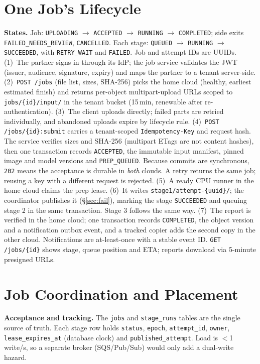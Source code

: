 \documentclass[10pt,a4paper]{article}
\begin{document}
\section{One Job's Lifecycle}
\begin{sloppypar}
\textbf{States.} Job: \texttt{UPLOADING} $\rightarrow$ \texttt{ACCEPTED} $\rightarrow$ \texttt{RUNNING}
$\rightarrow$ \texttt{COMPLETED}; side exits \texttt{FAILED\_NEEDS\_REVIEW}, \texttt{CANCELLED}. Each stage:
\texttt{QUEUED} $\rightarrow$ \texttt{RUNNING} $\rightarrow$ \texttt{SUCCEEDED}, with \texttt{RETRY\_WAIT} and
\texttt{FAILED}. Job and attempt IDs are UUIDs.
(1)~The partner signs in through its IdP; the job service validates the JWT (issuer, audience,
signature, expiry) and maps the partner to a tenant server-side.
(2)~\texttt{POST /jobs} (file list, sizes, SHA-256) picks the home cloud (healthy, earliest estimated
finish) and returns per-object multipart-upload URLs scoped to \texttt{jobs/\{id\}/input/} in the tenant
bucket (15\,min, renewable after re-authentication).
(3)~The client uploads directly; failed parts are retried individually, and abandoned uploads expire by
lifecycle rule.
(4)~\texttt{POST /jobs/\{id\}:submit} carries a tenant-scoped \texttt{Idempotency-Key} and request hash. The
service verifies sizes and SHA-256 (multipart ETags are not content hashes), then one transaction records
\texttt{ACCEPTED}, the immutable input manifest, pinned image and model versions and \texttt{PREP\_QUEUED}.
Because commits are synchronous, \texttt{202} means the acceptance is durable in \emph{both} clouds. A retry
returns the same job; reusing a key with a different request is rejected.
(5)~A ready CPU runner in the home cloud claims the prep lease.
(6)~It writes \texttt{stage1/attempt-\{uuid\}/}; the coordinator publishes it (\S\ref{sec:fail}), marking the
stage \texttt{SUCCEEDED} and queuing stage 2 in the same transaction. Stage 3 follows the same way.
(7)~The report is verified in the home cloud; one transaction records \texttt{COMPLETED}, the object
version and a notification outbox event, and a tracked copier adds the second copy in the other cloud.
Notifications are at-least-once with a stable event ID. \texttt{GET /jobs/\{id\}} shows stage, queue
position and ETA; reports download via 5-minute presigned URLs.
\end{sloppypar}

\section{Job Coordination and Placement}
\textbf{Acceptance and tracking.} The \texttt{jobs} and \texttt{stage\_runs} tables are the single source of
truth. Each stage row holds \texttt{status}, \texttt{epoch}, \texttt{attempt\_id}, \texttt{owner},
\texttt{lease\_expires\_at} (database clock) and \texttt{published\_attempt}. Load is $<$1\,write/s, so a
separate broker (SQS/Pub/Sub) would only add a dual-write hazard.
\end{document}

